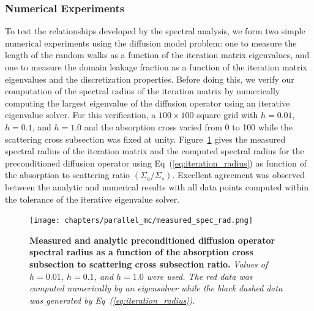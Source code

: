 \subsubsection{Numerical Experiments}
\label{subsec:numerical_experiments}
To test the relationships developed by the spectral analysis, we form
two simple numerical experiments using the diffusion model problem:
one to measure the length of the random walks as a function of the
iteration matrix eigenvalues, and one to measure the domain leakage
fraction as a function of the iteration matrix eigenvalues and the
discretization properties. Before doing this, we verify our
computation of the spectral radius of the iteration matrix by
numerically computing the largest eigenvalue of the diffusion operator
using an iterative eigenvalue solver. For this verification, a $100
\times 100$ square grid with $h=0.01$, $h=0.1$, and $h=1.0$ and the
absorption cross varied from 0 to 100 while the scattering cross
subsection was fixed at unity. Figure~\ref{fig:measured_spec_rad} gives
the measured spectral radius of the iteration matrix and the computed
spectral radius for the preconditioned diffusion operator using
Eq~(\ref{eq:iteration_radius}) as function of the absorption to
scattering ratio $(\Sigma_a / \Sigma_s)$. Excellent agreement was
observed between the analytic and numerical results with all data
points computed within the tolerance of the iterative eigenvalue
solver.
\begin{figure}[t!]
  \begin{spacing}{1.0}
    \begin{center}
      \texttt{[image: chapters/parallel\_mc/measured\_spec\_rad.png]}
    \end{center}
    \caption{\textbf{Measured and analytic preconditioned diffusion
        operator spectral radius as a function of the absorption cross
        subsection to scattering cross subsection ratio.} \textit{Values of
        $h=0.01$, $h=0.1$, and $h=1.0$ were used. The red data was
        computed numerically by an eigensolver while the black dashed
        data was generated by Eq~(\ref{eq:iteration_radius}).}}
    \label{fig:measured_spec_rad}
  \end{spacing}
\end{figure}

